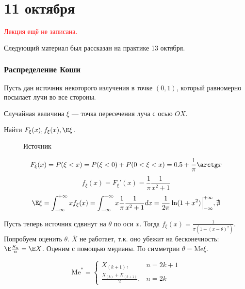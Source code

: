 \chapter{11 октября}

\textcolor{red}{Лекция ещё не записана.}

\begin{remark}
    Следующий материал был рассказан на практике 13 октября.
\end{remark}

\subsection{Распределение Коши}

Пусть дан источник некоторого излучения в точке \((0, 1)\), который равномерно посылает лучи во все стороны.

Случайная величина \(\xi\) --- точка пересечения луча с осью \(OX\).

Найти \(F_\xi(x), f_\xi(x), \E \xi\).

\begin{figure}[h]
    \centering
    \caption{Источник}
\end{figure}

\[F_\xi(x) = P(\xi < x) = P(\xi < 0) + P(0 < \xi < x) = 0.5 + \frac{1}{\pi} \arctg x\]
\[f_\xi(x) = F_\xi'(x) = \frac{1}{\pi} \frac{1}{x^2 + 1}\]
\[\E \xi = \int_{ - \infty }^{ + \infty } x f_\xi(x) = \int_{ - \infty }^{ + \infty } x \frac{1}{\pi} \frac{1}{x^2 + 1} dx = \frac{1}{2 \pi} \ln(1 + x^2) \Big|_{ - \infty }^{ + \infty}, \nexists\]

Пусть теперь источник сдвинут на \(\theta\) по оси \(x\). Тогда \(f_\xi(x) = \frac{1}{\pi (1 + (x - \theta)^2)}\). Попробуем оценить \(\theta\). \(\overline{X}\) не работает, т.к. оно убежит на бесконечность: \(\E \frac{S_n}{n} = \E X\). Оценим с помощью медианы. По симметрии \(\theta = \mathrm{Me} \xi\).

\[\mathrm{Me}^* = \begin{cases}
        X_{(k + 1)},                     & n = 2k + 1 \\
        \frac{X_{(k)} + X_{(k + 1)}}{2}, & n = 2k
    \end{cases}\]

